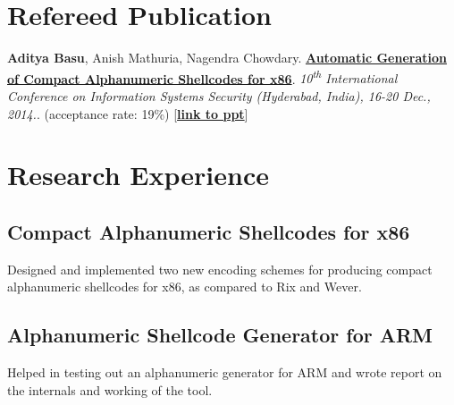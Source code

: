 \documentclass[]{deedy}
\begin{document}
\hfill
\begin{minipage}[t]{0.66\textwidth} 


\section{Refereed Publication}
\vspace{\topsep} %
\begin{tightemize}\item \textbf{Aditya Basu}, Anish Mathuria, Nagendra Chowdary. \href{https://dl.dropboxusercontent.com/u/9020146/resources/alpha-x86.pdf}{\textbf{Automatic Generation of Compact Alphanumeric Shellcodes for x86}}. \textit{10\textsuperscript{th} International Conference on Information Systems Security (Hyderabad, India), 16-20 Dec., 2014.}. (acceptance rate: 19\%) [\href{https://dl.dropboxusercontent.com/u/9020146/resources/ppt/alpha-x86.pdf}{\textbf{link to ppt}}]
\end{tightemize}


\section{Research Experience}

\subsection{Compact Alphanumeric Shellcodes for x86}
\begin{tightemize}
\item Designed and implemented two new encoding schemes for producing compact alphanumeric shellcodes for x86, as compared to Rix and Wever.
\end{tightemize}
\sectionsep

\subsection{Alphanumeric Shellcode Generator for ARM}
\begin{tightemize}
\item Helped in testing out an alphanumeric generator for ARM and wrote report on the internals and working of the tool.
\end{tightemize}
\sectionsep


\end{minipage}
\end{document}
